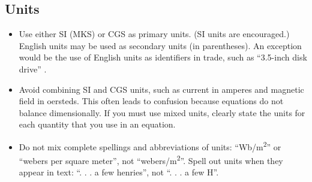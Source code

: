 \documentclass[conference]{IEEEtran}
\begin{document}
\subsection{Units}
\begin{itemize}
\item Use either SI (MKS) or CGS as primary units. (SI units are encouraged.) English units may be used as secondary units (in parentheses). An exception would be the use of English units as identifiers in trade, such as ``3.5-inch disk drive'' \cite{sjr}.
\item Avoid combining SI and CGS units, such as current in amperes and magnetic field in oersteds. This often leads to confusion because equations do not balance dimensionally. If you must use mixed units, clearly state the units for each quantity that you use in an equation.
\item Do not mix complete spellings and abbreviations of units: ``Wb/m\textsuperscript{2}'' or ``webers per square meter'', not ``webers/m\textsuperscript{2}''. Spell out units when they appear in text: ``. . . a few henries'', not ``. . . a few H''.
\end{itemize}



\end{document}

